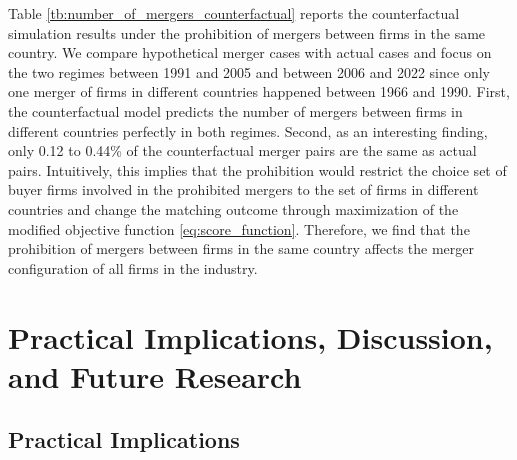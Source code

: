 \documentclass[10pt]{article}
\begin{document}
Table \ref{tb:number_of_mergers_counterfactual} reports the counterfactual simulation results under the prohibition of mergers between firms in the same country. 
We compare hypothetical merger cases with actual cases and focus on the two regimes between 1991 and 2005 and between 2006 and 2022 since only one merger of firms in different countries happened between 1966 and 1990.
First, the counterfactual model predicts the number of mergers between firms in different countries perfectly in both regimes. 
Second, as an interesting finding, only 0.12 to 0.44\% of the counterfactual merger pairs are the same as actual pairs.
Intuitively, this implies that the prohibition would restrict the choice set of buyer firms involved in the prohibited mergers to the set of firms in different countries and change the matching outcome through maximization of the modified objective function \eqref{eq:score_function}.
Therefore, we find that the prohibition of mergers between firms in the same country affects the merger configuration of all firms in the industry.








\section{Practical Implications, Discussion, and Future Research}\label{sec:practical_implications}

\subsection{Practical Implications}
\end{document}
